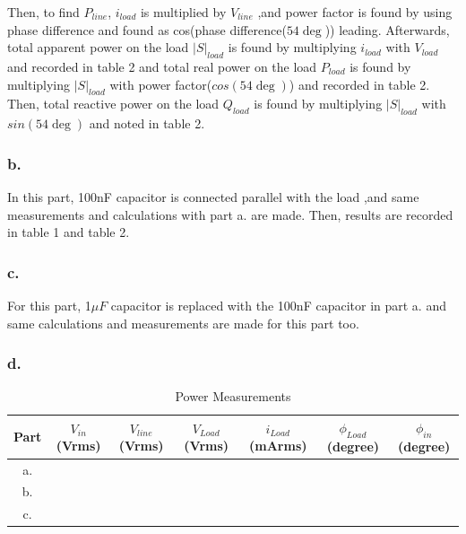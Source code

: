 \documentclass[letterpaper,12pt]{article}
\begin{document}
Then, to find \(P_{line}\), \(i_{load}\) is multiplied by \(V_{line}\) ,and power factor is found by using phase difference and found as cos(phase difference(\(54\deg \))) leading. Afterwards, total apparent power on the load \(|S|_{load}\) is found by multiplying \(i_{load}\) with \(V_{load}\) and recorded in table 2 and total real power on the load \(P_{load}\) is found by multiplying \(|S|_{load}\) with power factor(\(cos(54\deg )\)) and recorded in table 2. Then, total reactive power on the load \(Q_{load}\) is found by multiplying \(|S|_{load}\) with \(sin(54\deg )\) and noted in table 2.
\subsubsection{b.}
In this part, 100nF capacitor is connected parallel with the load ,and same measurements and calculations with part a. are made. Then, results are recorded in table 1 and table 2.   
\subsubsection{c.}
For this part, 1\(\mu F\) capacitor is replaced with the 100nF capacitor in part a. and same calculations and measurements are made for this part too.
\subsubsection{d.}

\begin{table}[H]
    \begin{center}
        \caption{Power Measurements}
        \vspace{2mm}
        \begin{tabular}{||c | c | c | c | c | c | c ||} 
            \hline
            Part & \(V_{in}\)\newline (Vrms) & \(V_{line}\)\newline (Vrms) & \(V_{Load}\) \newline (Vrms) &\(i_{Load}\)\newline (mArms) & \(\phi_{Load}\)\newline(degree) &\(\phi_{in}\)\newline(degree)  \\ [0.5ex] 
            \hline\hline
            a. & &  & & & &   \\ 
            \hline
            b. & &  & & & &    \\
            \hline
            c. & &  & & & &   \\ [1ex] 
            \hline
        \end{tabular}
\end{center}
\end{table}
\end{document}
